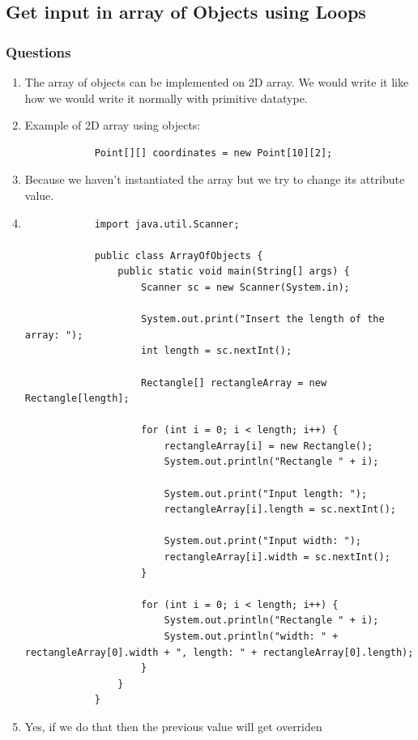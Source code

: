 \documentclass[12pt,titlepage]{article}
\begin{document}
\subsection{Get input in array of Objects using Loops}
\subsubsection{Questions}
\begin{enumerate}
    \item {
        The array of objects can be implemented on 2D array.
        We would write it like how we would write it normally with primitive datatype.
    }
    \newpage
    \item {
        Example of 2D array using objects:

        \begin{verbatim}
            Point[][] coordinates = new Point[10][2];
        \end{verbatim}
    }
    \item {
        Because we haven't instantiated the array but we try to change its attribute value.
    }
    \item {
        \begin{verbatim}
            import java.util.Scanner;

            public class ArrayOfObjects {
                public static void main(String[] args) {
                    Scanner sc = new Scanner(System.in);

                    System.out.print("Insert the length of the array: ");
                    int length = sc.nextInt();

                    Rectangle[] rectangleArray = new Rectangle[length];

                    for (int i = 0; i < length; i++) {
                        rectangleArray[i] = new Rectangle();
                        System.out.println("Rectangle " + i);

                        System.out.print("Input length: ");
                        rectangleArray[i].length = sc.nextInt();

                        System.out.print("Input width: ");
                        rectangleArray[i].width = sc.nextInt();
                    }

                    for (int i = 0; i < length; i++) {
                        System.out.println("Rectangle " + i);
                        System.out.println("width: " + rectangleArray[0].width + ", length: " + rectangleArray[0].length);
                    }
                }
            }
        \end{verbatim}
    }
    \item {
        Yes, if we do that then the previous value will get overriden
    }
\end{enumerate}
\end{document}
